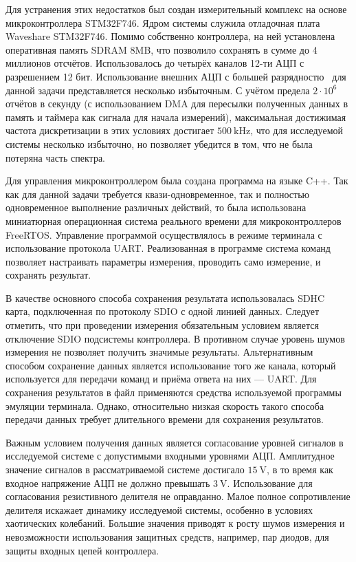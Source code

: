 Для устранения этих недостатков был создан
измерительный комплекс на основе
микроконтроллера STM32F746.
Ядром системы служила отладочная плата Waveshare STM32F746.
Помимо собственно контроллера, на ней установлена оперативная память
SDRAM 8MB, что позволило сохранять в сумме до 4 миллионов отсчётов.
Использовалось до четырёх каналов 12-ти АЦП с разрешением 12 бит.
Использование внешних АЦП с большей разрядностю~\cite{atu_st104a}
для данной задачи представляется несколько избыточным.
С учётом предела $2 \cdot 10^6$ отчётов в секунду
(с использованием DMA для пересылки полученных данных в память и таймера как сигнала для начала измерений),
максимальная достижимая частота дискретизации в этих условиях достигает $\SI{500}{\kilo\hertz}$,
что для исследуемой системы несколько избыточно,
но позволяет убедится в том, что не была потеряна часть спектра.

Для управления микроконтроллером была создана программа
на языке C++. Так как для данной задачи требуется
квази-одновременное, так и полностью одновременное выполнение
различных действий, то была использована миниатюрная операционная
система реального времени для микроконтроллеров FreeRTOS.
Управление программой осуществлялось в режиме терминала
с использование протокола UART. Реализованная
в программе система команд позволяет настраивать параметры измерения,
проводить само измерение, и сохранять результат.

В качестве основного способа сохранения результата
использовалась SDHC карта, подключенная по протоколу SDIO с одной линией данных.
Следует отметить, что при проведении измерения обязательным условием
является отключение SDIO подсистемы контроллера.
В противном случае уровень шумов измерения не позволяет
получить значимые результаты.
Альтернативным способом сохранение данных является
использование того же канала, который используется для передачи команд
и приёма ответа на них --- UART. Для сохранения результатов в файл
применяются средства используемой программы эмуляции терминала.
Однако, относительно низкая скорость такого способа передачи данных
требует длительного времени для сохранения результатов.

Важным условием получения данных является согласование уровней
сигналов в исследуемой системе с допустимыми входными уровнями АЦП.
Амплитудное значение сигналов в рассматриваемой системе достигало
$\SI{15}{\volt}$, в то время как входное напряжение АЦП не должно
превышать $\SI{3}{\volt}$.
Использование для согласования резистивного делителя
не оправданно. Малое полное сопротивление делителя
искажает динамику исследуемой системы, особенно в условиях
хаотических колебаний. Большие значения приводят
к росту шумов измерения и невозможности
использования защитных средств, например, пар диодов,
для защиты входных цепей контроллера.

